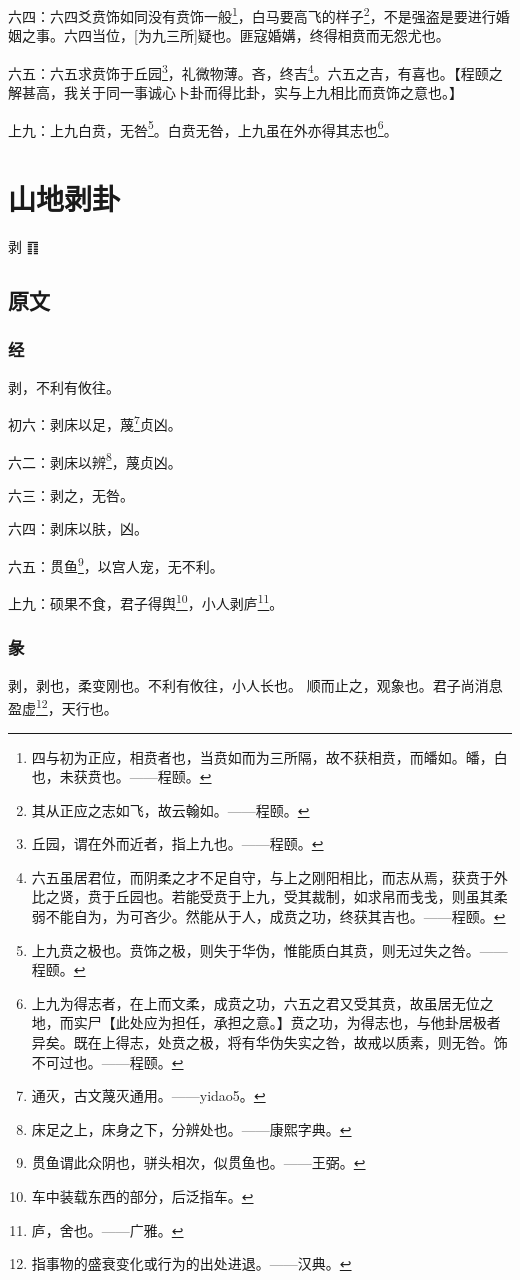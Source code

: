 \documentclass[12pt,oneside]{book}
\begin{document}
六四：六四爻贲饰如同没有贲饰一般\footnote{四与初为正应，相贲者也，当贲如而为三所隔，故不获相贲，而皤如。皤，白也，未获贲也。——程颐。}，白马要高飞的样子\footnote{其从正应之志如飞，故云翰如。——程颐。}，不是强盗是要进行婚姻之事。六四当位，[为九三所]疑也。匪寇婚媾，终得相贲而无怨尤也。

六五：六五求贲饰于丘园\footnote{丘园，谓在外而近者，指上九也。——程颐。}，礼微物薄。吝，终吉\footnote{六五虽居君位，而阴柔之才不足自守，与上之刚阳相比，而志从焉，获贲于外比之贤，贲于丘园也。若能受贲于上九，受其裁制，如求帛而戋戋，则虽其柔弱不能自为，为可吝少。然能从于人，成贲之功，终获其吉也。——程颐。}。六五之吉，有喜也。【程颐之解甚高，我关于同一事诚心卜卦而得比卦，实与上九相比而贲饰之意也。】

上九：上九白贲，无咎\footnote{上九贲之极也。贲饰之极，则失于华伪，惟能质白其贲，则无过失之咎。——程颐。}。白贲无咎，上九虽在外亦得其志也\footnote{上九为得志者，在上而文柔，成贲之功，六五之君又受其贲，故虽居无位之地，而实尸【此处应为担任，承担之意。】贲之功，为得志也，与他卦居极者异矣。既在上得志，处贲之极，将有华伪失实之咎，故戒以质素，则无咎。饰不可过也。——程颐。}。



\chapter{山地剥卦}
剥 {\Large ䷖}

\section{原文}
\subsection{经}
剥，不利有攸往。

初六：剥床以足，蔑\footnote{通灭，古文蔑灭通用。——yidao5。}贞凶。

六二：剥床以辨\footnote{床足之上，床身之下，分辨处也。——康熙字典。}，蔑贞凶。

六三：剥之，无咎。

六四：剥床以肤，凶。

六五：贯鱼\footnote{贯鱼谓此众阴也，骈头相次，似贯鱼也。——王弼。}，以宫人宠，无不利。

上九：硕果不食，君子得舆\footnote{车中装载东西的部分，后泛指车。}，小人剥庐\footnote{庐，舍也。——广雅。}。

\subsection{彖}
剥，剥也，柔变刚也。不利有攸往，小人长也。 顺而止之，观象也。君子尚消息盈虚\footnote{指事物的盛衰变化或行为的出处进退。——汉典。}，天行也。
\end{document}
